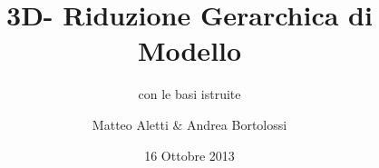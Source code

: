 \documentclass{beamer}
\author[Aletti \& Bortolossi]{Matteo Aletti \& Andrea Bortolossi}
\title[Hi-Mod in 3D]{3D- Riduzione Gerarchica di Modello}
\subtitle{con le basi istruite}
\institute[PoliMi]{Politecnico di Milano}
\date{16 Ottobre 2013}
\theoremstyle{plain}
\begin{document}
\begin{frame}
\maketitle
\end{frame}
\begin{frame}
\tableofcontents
\end{frame}



\flushlinkimages
\end{document}
